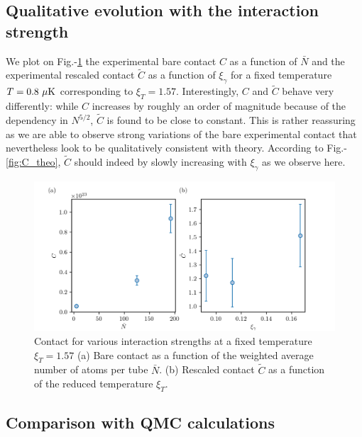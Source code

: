 \subsection{Qualitative evolution with the interaction strength}

We plot on Fig.-\ref{fig:C_vs_N} the experimental bare contact $C$ as a function of $\bar{N}$ and the experimental rescaled contact $\tilde{C}$ as a function of $\xi_{\gamma}$ for a fixed temperature $T=0.8 \ \mu \rm{K}$ corresponding to $\xi_T=1.57$. Interestingly, $C$ and $\tilde{C}$ behave very differently: while $C$ increases by roughly an order of magnitude because of the dependency in $N^{5/2}$, $\tilde{C}$ is found to be close to constant. This is rather reassuring as we are able to observe strong variations of the bare experimental contact that nevertheless look to be qualitatively consistent with theory. According to Fig.-\ref{fig:C_theo}, $\tilde{C}$ should indeed by slowly increasing with $\xi_{\gamma}$ as we observe here.

\begin{figure}
    \centering
    \includegraphics[width=\textwidth]{Fig/Chapter5/C_tilde_vs_N.png}
    \caption[Contact for various interaction strengths at a fixed temperature $\xi_T=1.57$]{Contact for various interaction strengths at a fixed temperature $\xi_T=1.57$ (a) Bare contact as a function of the weighted average number of atoms per tube $\bar{N}$. (b) Rescaled contact $\tilde{C}$ as a function of the reduced temperature $\xi_T$.}
    \label{fig:C_vs_N}
\end{figure}

\subsection{Comparison with QMC calculations}

